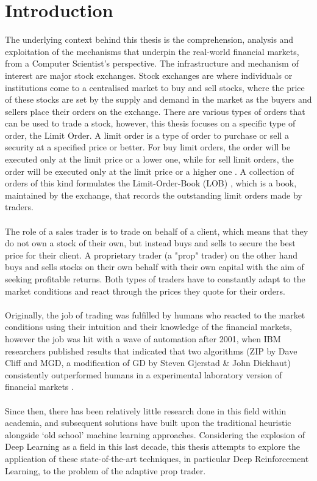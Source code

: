 \documentclass[ %
                    author={Ashwinder Khurana},
                supervisor={Prof Dave Cliff},
                    degree={MEng},
                     title={The Deeply Reinforced Trader},
                  subtitle={},
                      type={enterprise},
                      year={2020} ]{dissertation}
\begin{document}
\section{Introduction}

The underlying context behind this thesis is the comprehension, analysis and exploitation of the mechanisms that underpin the real-world financial markets, from a Computer Scientist's perspective. The infrastructure and mechanism of interest are major stock exchanges. Stock exchanges are where individuals or institutions come to a centralised market to buy and sell stocks, where the price of these stocks are set by the supply and demand in the market as the buyers and sellers place their orders on the exchange. There are various types of orders that can be used to trade a stock, however, this thesis focuses on a specific type of order, the Limit Order. A limit order is a type of order to purchase or sell a security at a specified price or better. For buy limit orders, the order will be executed only at the limit price or a lower one, while for sell limit orders, the order will be executed only at the limit price or a higher one \cite{limit-order}. 
A collection of orders of this kind formulates the Limit-Order-Book (LOB) , which is a book, maintained by the exchange, that records the outstanding limit orders made by traders.  
\\
\\
The role of a sales trader is to trade on behalf of a client, which means that they do not own a stock of their own, but instead buys and sells to secure the best price for their client. A proprietary trader (a "prop" trader) on the other hand buys and sells stocks on their own behalf with their own capital with the aim of seeking profitable returns. Both types of traders have to constantly adapt to the market conditions and react through the prices they quote for their orders. 
\\
\\
Originally, the job of trading was fulfilled by humans who reacted to the market conditions using their intuition and their knowledge of the financial markets, however the job was hit with a wave of automation after 2001, when IBM researchers published results that indicated that two algorithms (ZIP by Dave Cliff and MGD, a modification of GD by Steven Gjerstad \& John Dickhaut) consistently outperformed humans in a experimental laboratory version of financial markets \cite{algorithmic-trading-wiki}. 
\\
\\
Since then, there has been relatively little research done in this field within academia, and subsequent solutions have built upon the traditional heuristic alongside \enquote*{old school} machine learning approaches. Considering the explosion of Deep Learning as a field in this last decade, this thesis attempts to explore the application of these state-of-the-art techniques, in particular Deep Reinforcement Learning, to the problem of the adaptive prop trader.
\end{document}
